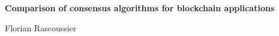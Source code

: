 \begin{titlepage}
    \begin{center}
        \vspace{2cm}
        
        \Huge
        \textbf{Comparison of consensus algorithms for blockchain applications}
            
        \vspace{2cm}
        \normalsize
        Florian Rascoussier
        
    \end{center}
\end{titlepage}